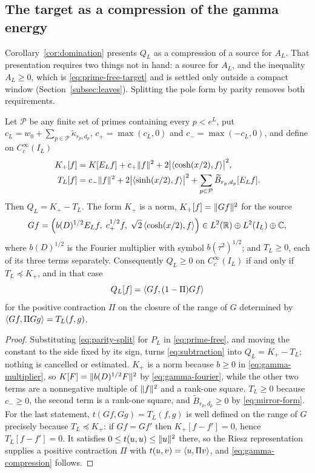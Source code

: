 \subsection{The target as a compression of the gamma energy}
\label{subsec:gammacompression}
Corollary~\ref{cor:domination} presents $Q_L$ as a compression of a source for
$A_L$. That presentation requires two things not in hand: a source for $A_L$,
and the inequality $A_L\geq0$, which is \eqref{eq:prime-free-target} and is
settled only outside a compact window (Section~\ref{subsec:leaves}). Splitting
the pole form by parity removes both requirements.

\begin{proposition}
\label{prop:gamma-compression}
Let $\mathcal P$ be any finite set of primes containing every $p<e^L$, put
$c_L=w_0+\sum_{p\in\mathcal P}\widetilde\kappa_{r_p,d_p}$,
$c_+=\max(c_L,0)$ and $c_-=\max(-c_L,0)$, and define on $C_c^\infty(I_L)$
\begin{align}
 K_+[f]&=K[E_Lf]+c_+\lVert f\rVert^2+2\big|\langle \cosh(x/2),f\rangle\big|^2,
 \label{eq:source-side}\\
 T_L[f]&=c_-\lVert f\rVert^2+2\big|\langle \sinh(x/2),f\rangle\big|^2
        +\sum_{p\in\mathcal P}\widetilde B_{r_p,d_p}[E_Lf].
 \label{eq:subtracted-side}
\end{align}
Then $Q_L=K_+-T_L$. The form $K_+$ is a norm, $K_+[f]=\lVert Gf\rVert^2$ for the
source
\begin{equation}\label{eq:explicit-source}
 Gf=\Big(b(D)^{1/2}E_Lf,\;c_+^{1/2}f,\;\sqrt2\,\langle \cosh(x/2),f\rangle\Big)
 \in L^2(\mathbb R)\oplus L^2(I_L)\oplus\mathbb C,
\end{equation}
where $b(D)^{1/2}$ is the Fourier multiplier with symbol
$b(\tau^2)^{1/2}$; and $T_L\geq0$, each of its three terms separately.
Consequently $Q_L\geq0$ on $C_c^\infty(I_L)$ if and only if
$T_L\preceq K_+$, and in that case
\begin{equation}\label{eq:gamma-compression}
 Q_L[f]=\langle Gf,(1-\Pi)Gf\rangle
\end{equation}
for the positive contraction $\Pi$ on the closure of the range of $G$
determined by $\langle Gf,\Pi Gg\rangle=T_L(f,g)$.
\end{proposition}
\begin{proof}
Substituting \eqref{eq:parity-split} for $P_L$ in \eqref{eq:prime-free}, and
moving the constant to the side fixed by its sign, turns
\eqref{eq:subtraction} into $Q_L=K_+-T_L$; nothing is cancelled or estimated.
$K_+$ is a norm because $b\geq0$ in \eqref{eq:gamma-multiplier}, so
$K[F]=\lVert b(D)^{1/2}F\rVert^2$ by \eqref{eq:gamma-fourier}, while the other two
terms are a nonnegative multiple of $\lVert f\rVert^2$ and a rank-one square.
$T_L\geq0$ because $c_-\geq0$, the second term is a rank-one square, and
$\widetilde B_{r_p,d_p}\geq0$ by \eqref{eq:mirror-form}. For the last
statement, $t(Gf,Gg)=T_L(f,g)$ is well defined on the range of $G$ precisely
because $T_L\preceq K_+$: if $Gf=Gf'$ then $K_+[f-f']=0$, hence
$T_L[f-f']=0$. It satisfies $0\leq t(u,u)\leq\lVert u\rVert^2$ there, so the Riesz
representation supplies a positive contraction $\Pi$ with
$t(u,v)=\langle u,\Pi v\rangle$, and \eqref{eq:gamma-compression} follows.
\end{proof}

